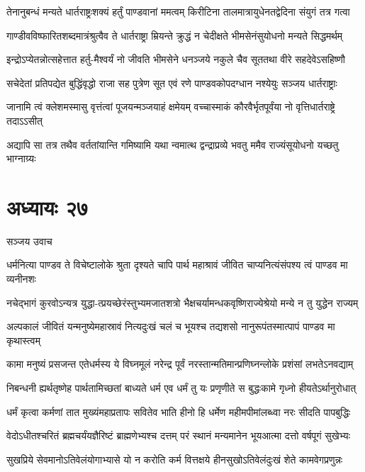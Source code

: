 \twolineshloka
{तेनानुबन्धं मन्यते धार्तराष्ट्रःशक्यं हर्तुं पाण्डवानां ममत्वम्}
{किरीटिना तालमात्रायुधेनतद्वेदिना संयुगं तत्र गत्वा}


\twolineshloka
{गाण्डीवविष्फारितशब्दमात्रंश्रुत्वैव ते धार्तराष्ट्रा म्रियन्ते}
{क्रुद्धं न चेदीक्षते भीमसेनंसुयोधनो मन्यते सिद्धमर्थम्}


\twolineshloka
{इन्द्रोऽप्येतन्नोत्सहेत्तात हर्तु-मैश्वर्यं नो जीवति भीमसेने}
{धनञ्जये नकुले चैव सूततथा वीरे सहदेवेऽसहिष्णौ}


\twolineshloka
{सचेदेतां प्रतिपद्येत बुद्धिंवृद्धो राजा सह पुत्रेण सूत}
{एवं रणे पाण्डवकोपदग्धान नश्येयुः सञ्जय धार्तराष्ट्राः}


\twolineshloka
{जानामि त्वं क्लेशमस्मासु वृत्तंत्वां पूजयन्मञ्जयाहं क्षमेयम्}
{वच्चास्माकं कौरवैर्भृतपूर्वंया नो वृत्तिधार्तराष्ट्रे तदाऽऽसीत्}


\twolineshloka
{अद्यापि सा तत्र तथैव वर्ततांयान्ति गमिष्यामि यथा न्वमात्थ}
{द्वन्द्राप्रव्ये भवतु ममैव राज्यंसूयोधनो यच्छतु भाग्नाग्र्यः}


\chapter{अध्यायः २७}
\twolineshloka
{सञ्जय उवाच}
{}


\twolineshloka
{धर्मनित्या पाण्डव ते विचेष्टालोके श्रुता दृश्यते चापि पार्थ}
{महाश्रावं जीवित चाप्यनित्यंसंपश्य त्वं पाण्डव मा व्यनीनशः}


\twolineshloka
{नचेद्भागं कुरवोऽन्यत्र युद्धा-त्प्रयच्छेरंस्तुभ्यमजातशत्रो}
{भैक्षचर्यामन्धकवृष्णिराज्येश्रेयो मन्ये न तु युद्धेन राज्यम्}


\twolineshloka
{अल्पकालं जीवितं यन्मनुष्येमहास्रावं नित्यदुःखं चलं च}
{भूयश्च तद्यशसो नानुरूपंतस्मात्पापं पाण्डव मा कृथास्त्वम्}


\twolineshloka
{कामा मनुष्यं प्रसजन्त एतेधर्मस्य ये विघ्नमूलं नरेन्द्र}
{पूर्वं नरस्तान्मतिमान्प्रणिघ्नन्लोके प्रशंसां लभतेऽनवद्याम्}


\twolineshloka
{निबन्धनी ह्यर्थतृष्णेह पार्थतामिच्छतां बाध्यते धर्म एव}
{धर्मं तु यः प्रणृणीते स बुद्धःकामे गृध्नो हीयतेऽर्थानुरोधात्}


\twolineshloka
{धर्मं कृत्वा कर्मणां तात मुख्यंमहाप्रतापः सवितेव भाति}
{हीनो हि धर्मेण महीमपीमांलब्ध्वा नरः सीदति पापबुद्धिः}


\twolineshloka
{वेदोऽधीतश्चरितं ब्रह्मचर्यंयज्ञैरिष्टं ब्राह्मणेभ्यश्च दत्तम्}
{परं स्थानं मन्यमानेन भूयआत्मा दत्तो वर्षपूगं सुखेभ्यः}


\twolineshloka
{सुखप्रिये सेवमानोऽतिवेलंयोगाभ्यासे यो न करोति कर्म}
{वित्तक्षये हीनसुखोऽतिवेलंदुःखं शेते कामवेगप्रणुन्नः}


